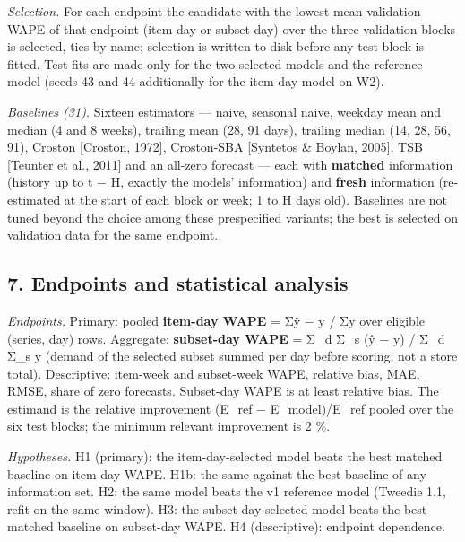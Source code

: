 \documentclass[
]{article}
\begin{document}
\emph{Selection.} For each endpoint the candidate with the lowest mean
validation WAPE of that endpoint (item-day or subset-day) over the three
validation blocks is selected, ties by name; selection is written to
disk before any test block is fitted. Test fits are made only for the
two selected models and the reference model (seeds 43 and 44
additionally for the item-day model on W2).

\emph{Baselines (31).} Sixteen estimators --- naive, seasonal naive,
weekday mean and median (4 and 8 weeks), trailing mean (28, 91 days),
trailing median (14, 28, 56, 91), Croston {[}Croston, 1972{]},
Croston-SBA {[}Syntetos \& Boylan, 2005{]}, TSB {[}Teunter et al.,
2011{]} and an all-zero forecast --- each with \textbf{matched}
information (history up to t − H, exactly the models' information) and
\textbf{fresh} information (re-estimated at the start of each block or
week; 1 to H days old). Baselines are not tuned beyond the choice among
these prespecified variants; the best is selected on validation data for
the same endpoint.

\subsection{7. Endpoints and statistical
analysis}\label{endpoints-and-statistical-analysis}

\emph{Endpoints.} Primary: pooled \textbf{item-day WAPE} = Σ\textbar ŷ −
y\textbar{} / Σy over eligible (series, day) rows. Aggregate:
\textbf{subset-day WAPE} = Σ\_d \textbar Σ\_s (ŷ − y)\textbar{} / Σ\_d
Σ\_s y (demand of the selected subset summed per day before scoring; not
a store total). Descriptive: item-week and subset-week WAPE, relative
bias, MAE, RMSE, share of zero forecasts. Subset-day WAPE is at least
\textbar relative bias\textbar. The estimand is the relative improvement
(E\_ref − E\_model)/E\_ref pooled over the six test blocks; the minimum
relevant improvement is 2 \%.

\emph{Hypotheses.} H1 (primary): the item-day-selected model beats the
best matched baseline on item-day WAPE. H1b: the same against the best
baseline of any information set. H2: the same model beats the v1
reference model (Tweedie 1.1, refit on the same window). H3: the
subset-day-selected model beats the best matched baseline on subset-day
WAPE. H4 (descriptive): endpoint dependence.
\end{document}
